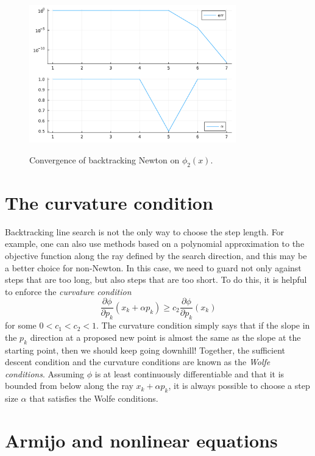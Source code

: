 \documentclass[12pt, leqno]{article} %
\begin{document}
\begin{figure}
\begin{center}
  \includegraphics[width=0.8\textwidth]{fig/2023-04-17-phi2-newton-bt.pdf} \\
\end{center}
\caption{Convergence of backtracking Newton on $\phi_2(x)$.}
\label{fig:phi2-newton-bt}
\end{figure}

\section{The curvature condition}

Backtracking line search is not the only way to choose the step length.
For example, one can also use methods based on a polynomial
approximation to the objective function along the ray defined by the
search direction, and this may be a better choice for non-Newton. In
this case, we need to guard not only against steps that are too long,
but also steps that are too short. To do this, it is helpful to enforce
the \emph{curvature condition}
\[\frac{\partial \phi}{\partial p_k}(x_k+\alpha p_k) \geq c_2
  \frac{\partial \phi}{\partial p_k}(x_k)\] for some
\(0 < c_1 < c_2 < 1\). The curvature condition simply says that if the
slope in the \(p_k\) direction at a proposed new point is almost the
same as the slope at the starting point, then we should keep going
downhill! Together, the sufficient descent condition and the curvature
conditions are known as the \emph{Wolfe conditions}. Assuming \(\phi\)
is at least continuously differentiable and that it is bounded from
below along the ray \(x_k+\alpha p_k\), it is always possible to choose
a step size \(\alpha\) that satisfies the Wolfe conditions.

\section{Armijo and nonlinear equations}
\end{document}
